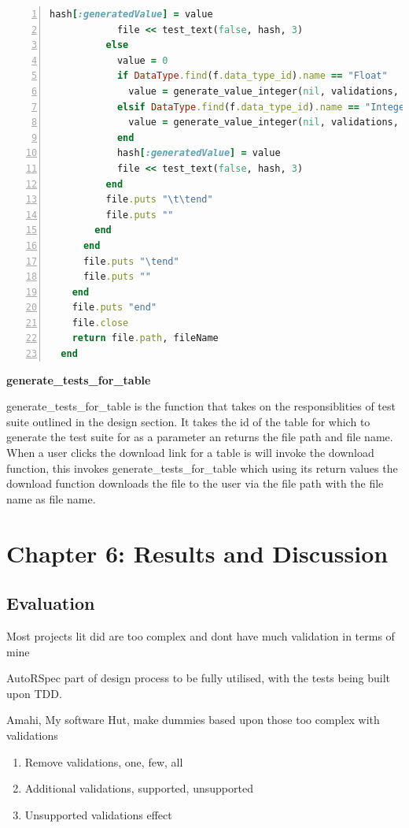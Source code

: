 \documentclass[a4paper,12pt]{article}
\begin{document}
\begin{lstlisting}[frame=single,numbers=left,language = ruby,caption= {generate\_tests\_for\_table}, label={code:bigboy}]
            hash[:generatedValue] = value
            file << test_text(false, hash, 3)
          else
            value = 0
            if DataType.find(f.data_type_id).name == "Float"
              value = generate_value_integer(nil, validations, "Float")
            elsif DataType.find(f.data_type_id).name == "Integer"
              value = generate_value_integer(nil, validations, "Integer")
            end
            hash[:generatedValue] = value
            file << test_text(false, hash, 3)
          end
          file.puts "\t\tend"
          file.puts ""
        end
      end
      file.puts "\tend"
      file.puts ""
    end
    file.puts "end"
    file.close
    return file.path, fileName
  end
\end{lstlisting}
\par \textbf{generate\_tests\_for\_table}
\par generate\_tests\_for\_table is the function that takes on the responsiblities of test suite outlined in the design section. It takes the id of the table for which to generate the test suite for as a parameter an returns the file path and file name. When a user clicks the download link for a table is will invoke the download function, this invokes generate\_tests\_for\_table which using its return values the download function downloads the file to the user via the file path with the file name as file name.

\section{Chapter 6: Results and Discussion}

\subsection{Evaluation}
\par Most projects lit did are too complex and dont have much validation in terms of mine

\par AutoRSpec part of design process to be fully utilised, with the tests being built upon TDD. 

\par Amahi, My software Hut, make dummies based upon those too complex with validations

\begin{enumerate}
\item Remove validations, one, few, all
\item Additional validations, supported, unsupported
\item Unsupported validations effect
\end{enumerate}
\end{document}
